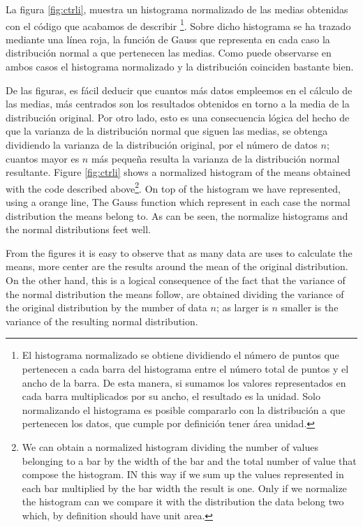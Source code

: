 \begin{paracol}{2}
La figura \ref{fig:ctrli}, muestra un histograma normalizado de las medias obtenidas con el código que acabamos de describir \footnote{El histograma normalizado se obtiene dividiendo el número de puntos que pertenecen a cada barra del histograma entre el número total de puntos y el ancho de la barra. De esta manera, si sumamos los valores representados en cada barra multiplicados por su ancho, el resultado es la unidad. Solo normalizando el histograma es posible compararlo con la distribución a que pertenecen los datos, que cumple por definición tener área unidad.}. Sobre dicho histograma se ha trazado mediante una línea roja, la función de Gauss que representa en cada caso la distribución normal a que pertenecen las medias. Como puede observarse en ambos casos el histograma normalizado y la distribución coinciden bastante bien.

De las figuras, es fácil deducir que cuantos más datos empleemos en el cálculo de las medias, más centrados son los resultados obtenidos en torno a la media de la distribución original. Por otro lado, esto es una consecuencia lógica del hecho de que la varianza de la distribución normal que siguen las medias, se obtenga dividiendo la varianza de la distribución original, por el número de datos $n$; cuantos mayor es $n$ más pequeña resulta la varianza de la distribución normal resultante.
\switchcolumn
Figure \ref{fig:ctrli} shows a normalized histogram of the means obtained with the code described above\footnote{We can obtain a normalized histogram dividing the number of values belonging to a bar by the width of the bar and the total number of value that compose the histogram. IN this way if we sum up the values represented in each bar multiplied by the bar width the result is one. Only if we normalize the histogram can we compare it with the distribution the data belong two which, by definition should have unit area.}. On top of the histogram we have represented, using a orange line, The Gauss function which represent in each case the normal distribution the means belong to. As can be seen, the normalize histograms and the normal distributions feet well.

From the figures it is easy to observe that as many data are uses to calculate the means, more center are the results around the mean of the original distribution. On the other hand, this is a logical consequence of the fact that the variance of the normal distribution the means follow, are obtained dividing the variance of the original distribution by the number of data $n$; as larger is $n$ smaller is the variance of the resulting normal distribution.  
\end{paracol}
 
